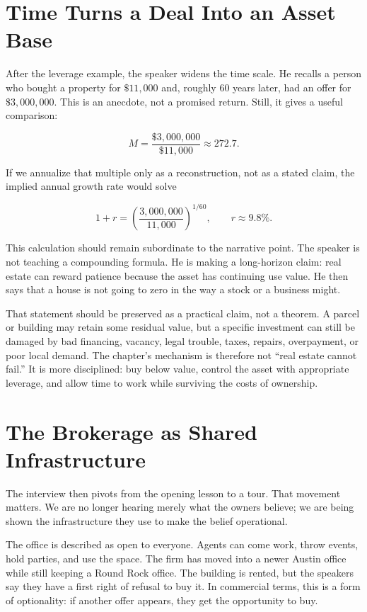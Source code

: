 \section{Time Turns a Deal Into an Asset Base}

After the leverage example, the speaker widens the time scale. He recalls a person who bought a property for \(\$11{,}000\) and, roughly \(60\) years later, had an offer for \(\$3{,}000{,}000\). This is an anecdote, not a promised return. Still, it gives a useful comparison:

\begin{equation}
M
=
\frac{\$3{,}000{,}000}{\$11{,}000}
\approx
272.7.
\end{equation}

If we annualize that multiple only as a reconstruction, not as a stated claim, the implied annual growth rate would solve

\begin{equation}
1+r
=
\left(\frac{3{,}000{,}000}{11{,}000}\right)^{1/60},
\qquad
r \approx 9.8\%.
\end{equation}

This calculation should remain subordinate to the narrative point. The speaker is not teaching a compounding formula. He is making a long-horizon claim: real estate can reward patience because the asset has continuing use value. He then says that a house is not going to zero in the way a stock or a business might.

That statement should be preserved as a practical claim, not a theorem. A parcel or building may retain some residual value, but a specific investment can still be damaged by bad financing, vacancy, legal trouble, taxes, repairs, overpayment, or poor local demand. The chapter's mechanism is therefore not ``real estate cannot fail.'' It is more disciplined: buy below value, control the asset with appropriate leverage, and allow time to work while surviving the costs of ownership.

\section{The Brokerage as Shared Infrastructure}

The interview then pivots from the opening lesson to a tour. That movement matters. We are no longer hearing merely what the owners believe; we are being shown the infrastructure they use to make the belief operational.

The office is described as open to everyone. Agents can come work, throw events, hold parties, and use the space. The firm has moved into a newer Austin office while still keeping a Round Rock office. The building is rented, but the speakers say they have a first right of refusal to buy it. In commercial terms, this is a form of optionality: if another offer appears, they get the opportunity to buy.

